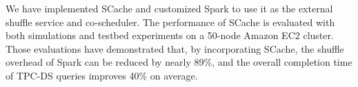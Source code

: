 \begin{englishabstract}
We have implemented SCache and customized Spark to use it as the external shuffle service and co-scheduler. 
The performance of SCache is evaluated with both simulations and testbed experiments on a 50-node Amazon EC2 cluster.
Those evaluations have demonstrated that, by incorporating SCache, the shuffle overhead of Spark can be reduced by nearly 89\%, 
and the overall completion time of TPC-DS queries improves 40\% on average.


\end{englishabstract}


